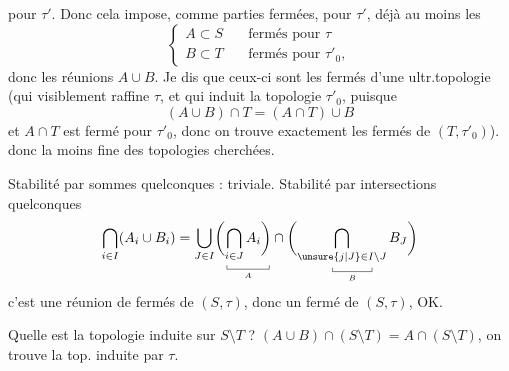 pour $ \tau'$. Donc cela impose, comme parties fermées, pour $\tau'$, déjà au moins les
\[
\left\{\begin{aligned}
 A\subset S&\quad\text{fermés pour }\tau\\
 B\subset T&\quad\text{fermés pour }\tau'_0,
\end{aligned}\right.
\]
donc les réunions $A\cup B$. Je dis que ceux-ci sont  les fermés d'une ultr.topologie (qui visiblement raffine $\tau$, et qui induit la topologie $\tau'_0$, puisque
\[
 (A\cup B)\cap T=(A\cap T)\cup B
\]
et $A\cap T$ est fermé pour $\tau'_0$, donc on trouve exactement les fermés de $(T,\tau'_0)$).
 donc la  moins fine des topologies cherchées.

 Stabilité par sommes quelconques : triviale. Stabilité par intersections quelconques
\[
 \bigcap_{i\in I}(A_i\cup B_i)=
 \bigcup_{J\in I}
 \biggl(\underset{\underset{A}{\rule{.35pt}{.3em}\rule{3em}{.35pt}\rule{.35pt}{.3em}}}{\bigcap_{i\in J}A_i\biggr)}
 \cap\biggl(\underset{\underset{B}{\rule{.35pt}{.3em}\rule{2.8em}{.35pt}\rule{.35pt}{.3em}}}{\bigcap_{\unsure{j|J}\in I\setminus J} B_J}\biggr)
\]
c'est une réunion de fermés de $(S,\tau)$, donc un fermé de $(S,\tau)$, OK.

Quelle est la topologie induite  sur $S\setminus T$ ? $(A\cup B)\cap(S\setminus T)=A\cap(S\setminus T)$, on trouve la top. induite par $\tau$.

